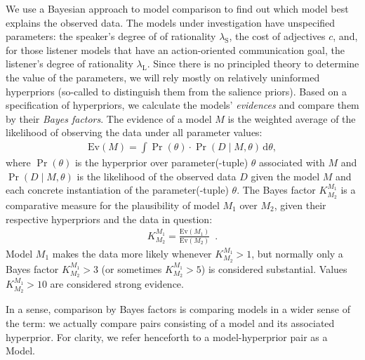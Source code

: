 We use a Bayesian approach to model comparison
\cite{Jeffreys1961:Theory-of-Proba,KassRaftery1995:Bayes-Factors,Jaynes2003:Probability-The,VandekerckhoveMatzke2013:Model-Compariso} to find out which
model best explains the observed data. The models under investigation
have unspecified parameters: the speaker's degree of of rationality
$\lambda_\mathrm{S}$, the cost of adjectives $c$, and, for those
listener models that have an action-oriented communication goal, the
listener's degree of rationality $\lambda_\mathrm{L}$. Since there is
no principled theory to determine the value of the parameters, we will
rely mostly on relatively uninformed hyperpriors (so-called to
distinguish them from the salience priors). Based on a specification
of hyperpriors, we calculate the models' \emph{evidences} and compare
them by their \emph{Bayes factors}. The evidence of a model $M$ is the
weighted average of the likelihood of observing the data under all
parameter values:
\begin{align}
  \label{BMA}
  \mathrm{Ev}(M)= \int \Pr(\theta) \cdot \Pr(D  \mid  M, \theta)\, \mathrm{d}\theta,
\end{align}
where $\Pr(\theta)$ is the hyperprior over parameter(-tuple) $\theta$
associated with $M$ and $\Pr(D  \mid  M, \theta)$ is the likelihood of the
observed data $D$ given the model $M$ and each concrete instantiation
of the parameter(-tuple) $\theta$. The Bayes factor
$K^{M_1}_{M_2}$ is a comparative measure for the plausibility of model
$M_1$ over $M_2$, given their respective hyperpriors and the data in
question:
\begin{align}
  K^{M_1}_{M_2} = \frac{\mathrm{Ev}(M_1)}{\mathrm{Ev}(M_2)} \enspace .
\end{align}
Model $M_1$ makes the data more likely whenever $K^{M_1}_{M_2} > 1$, but
normally only a Bayes factor $K^{M_1}_{M_2} >3$ (or sometimes
$K^{M_1}_{M_2} > 5$) is considered substantial. Values $K^{M_1}_{M_2}
> 10$ are considered strong evidence.

In a sense, comparison by Bayes factors is comparing models in a wider
sense of the term: we actually compare pairs consisting of a model and
its associated hyperprior. For clarity, we refer henceforth to a
model-hyperprior pair as a Model.

